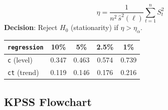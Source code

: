 \documentclass[10pt,a4paper,twocolumn]{article}
\begin{document}
\begin{tcolorbox}[mathbox={KPSS Formula 3 --- Test Statistic}]
\vspace{-4pt}
\begin{equation}\label{eq:kpss}
  \eta = \frac{1}{n^2\,\hat{s}^2(\ell)}\sum_{t=1}^{n}S_t^2
\end{equation}
\vspace{-2pt}
\textbf{Decision}: Reject $H_0$ (stationarity) if $\eta > \eta_\alpha$.
\begin{center}\small
\begin{tabular}{@{}lcccc@{}}
\toprule
\texttt{regression} & 10\% & 5\% & 2.5\% & 1\%\\\midrule
\texttt{c} (level)  & 0.347 & 0.463 & 0.574 & 0.739\\
\texttt{ct} (trend) & 0.119 & 0.146 & 0.176 & 0.216\\
\bottomrule
\end{tabular}
\end{center}
\vspace{-2pt}
\end{tcolorbox}

\subsection{KPSS Flowchart}
\end{document}
